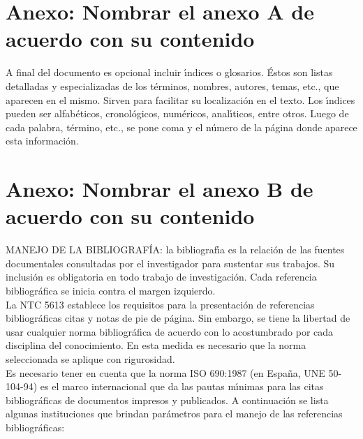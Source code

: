\begin{appendix}

\chapter{Anexo: Nombrar el anexo A de acuerdo con su contenido}
A final del documento es opcional incluir \'{\i}ndices o glosarios. \'{E}stos son listas detalladas y especializadas de los t\'{e}rminos, nombres, autores, temas, etc., que aparecen en el mismo. Sirven para facilitar su localizaci\'{o}n en el texto. Los \'{\i}ndices pueden ser alfab\'{e}ticos, cronol\'{o}gicos, num\'{e}ricos, anal\'{\i}ticos, entre otros. Luego de cada palabra, t\'{e}rmino, etc., se pone coma y el n\'{u}mero de la p\'{a}gina donde aparece esta informaci\'{o}n.\\

\chapter{Anexo: Nombrar el anexo B de acuerdo con su contenido}
MANEJO DE LA BIBLIOGRAF\'{I}A: la bibliograf\'{\i}a es la relaci\'{o}n de las fuentes documentales consultadas por el investigador para sustentar sus trabajos. Su inclusi\'{o}n es obligatoria en todo trabajo de investigaci\'{o}n. Cada referencia bibliogr\'{a}fica se inicia contra el margen izquierdo.\\

La NTC 5613 establece los requisitos para la presentaci\'{o}n de referencias bibliogr\'{a}ficas citas y notas de pie de p\'{a}gina. Sin embargo, se tiene la libertad de usar cualquier norma bibliogr\'{a}fica de acuerdo con lo acostumbrado por cada disciplina del conocimiento. En esta medida es necesario que la norma seleccionada se aplique con rigurosidad.\\

Es necesario tener en cuenta que la norma ISO 690:1987 (en Espa\~{n}a, UNE 50-104-94) es el marco internacional que da las pautas m\'{\i}nimas para las citas bibliogr\'{a}ficas de documentos impresos y publicados. A continuaci\'{o}n se lista algunas instituciones que brindan par\'{a}metros para el manejo de las referencias bibliogr\'{a}ficas:\\


\end{appendix}
